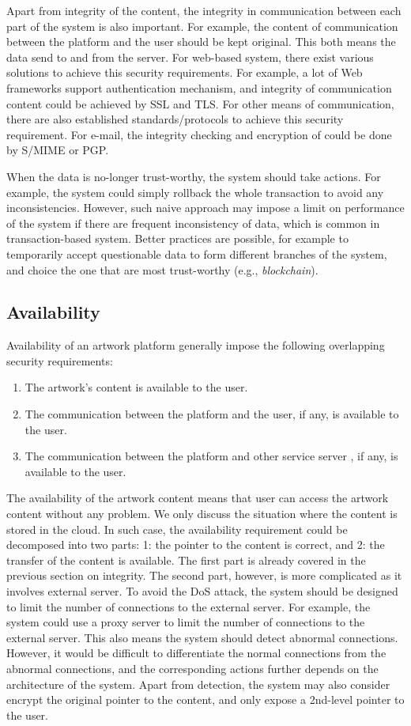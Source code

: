 Apart from integrity of the content, the integrity in communication between each part of the system is also important. For example, the content of communication between the platform and the user should be kept original. This both means the data send to and from the server. For web-based system, there exist various solutions to achieve this security requirements. For example, a lot of Web frameworks support authentication mechanism, and integrity of communication content could be achieved by SSL and TLS. For other means of communication, there are also established standards/protocols to achieve this security requirement. For e-mail, the integrity checking and encryption of could be done by S/MIME \citep{peterson2004s} or PGP\citep{network2007openpgp}.

When the data is no-longer trust-worthy, the system should take actions. For example, the system could simply rollback the whole transaction to avoid any inconsistencies. However, such naive approach may impose a limit on performance of the system if there are frequent inconsistency of data, which is common in transaction-based system. Better practices are possible, for example to temporarily accept questionable data to form different branches of the system, and choice the one that are most trust-worthy (e.g., \textit{blockchain}).


\subsection{Availability}

Availability of an artwork platform generally impose the following overlapping security requirements:

\begin{enumerate}
\item The artwork's content is available to the user.
\item The communication between the platform and the user, if any, is available to the user.
\item The communication between the platform and other service server , if any, is available to the user.
\end{enumerate}

The availability of the artwork content means that user can access the artwork content without any problem. We only discuss the situation where the content is stored in the cloud. In such case, the availability requirement could be decomposed into two parts: 1: the pointer to the content is correct, and 2: the transfer of the content is available. The first part is already covered in the previous section on integrity. The second part, however, is more complicated as it involves external server. To avoid the DoS attack, the system should be designed to limit the number of connections to the external server. For example, the system could use a proxy server to limit the number of connections to the external server. This also means the system should detect abnormal connections. However, it would be difficult to differentiate the normal connections from the abnormal connections, and the corresponding actions further depends on the architecture of the system. Apart from detection, the system may also consider encrypt the original pointer to the content, and only expose a 2nd-level pointer to the user.
